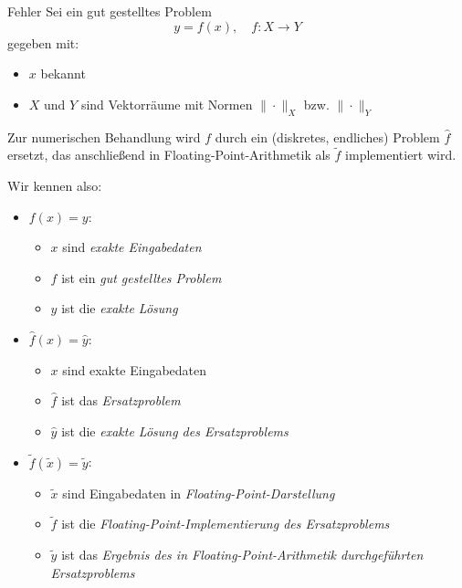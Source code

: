 \begin{defi}{Fehler}
    Sei ein gut gestelltes Problem
    \[
        y = f(x), \quad f: X \to Y
    \]
    gegeben mit:
    \begin{itemize}
        \item $x$ bekannt
        \item $X$ und $Y$ sind Vektorräume mit Normen $\| \cdot \|_X$ bzw. $\| \cdot \|_Y$
    \end{itemize}

    Zur numerischen Behandlung wird $f$ durch ein (diskretes, endliches) Problem $\hat{f}$ ersetzt, das anschließend in Floating-Point-Arithmetik als $\tilde{f}$ implementiert wird.

    Wir kennen also:
    \begin{itemize}
        \item $f(x) = y$:
              \begin{itemize}
                  \item $x$ sind \emph{exakte Eingabedaten}
                  \item $f$ ist ein \emph{gut gestelltes Problem}
                  \item $y$ ist die \emph{exakte Lösung}
              \end{itemize}
        \item $\hat{f}(x) = \hat{y}$:
              \begin{itemize}
                  \item $x$ sind exakte Eingabedaten
                  \item $\hat{f}$ ist das \emph{Ersatzproblem}
                  \item $\hat{y}$ ist die \emph{exakte Lösung des Ersatzproblems}
              \end{itemize}
        \item $\tilde{f}(\tilde{x}) = \tilde{y}$:
              \begin{itemize}
                  \item $\tilde{x}$ sind Eingabedaten in \emph{Floating-Point-Darstellung}
                  \item $\tilde{f}$ ist die \emph{Floating-Point-Implementierung des Ersatzproblems}
                  \item $\tilde{y}$ ist das \emph{Ergebnis des in Floating-Point-Arithmetik durchgeführten Ersatzproblems}
              \end{itemize}
    \end{itemize}


\end{defi}
